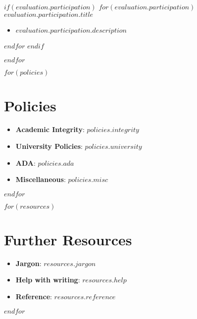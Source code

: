 \documentclass[$fontsize$, letterpaper]{article}
\begin{document}
$if(evaluation.participation)$
  $for(evaluation.participation)$ 
    \textbf{$evaluation.participation.title$}
    \begin{itemize}[leftmargin=*]
    \item $evaluation.participation.description$ 
    \end{itemize}
  $endfor$
$endif$

$endfor$

$for(policies)$

\section*{Policies}
\begin{itemize}[leftmargin=*]
\item \textbf{Academic Integrity}: $policies.integrity$
\item \textbf{University Policies}: $policies.university$
\item \textbf{ADA}: $policies.ada$
\item \textbf{Miscellaneous}: $policies.misc$
\end{itemize}

$endfor$

$for(resources)$

\section*{Further Resources}
\begin{itemize}[leftmargin=*]
\item \textbf{Jargon}: $resources.jargon$
\item \textbf{Help with writing}: $resources.help$
\item \textbf{Reference}: $resources.reference$
\end{itemize}

$endfor$
\end{document}
